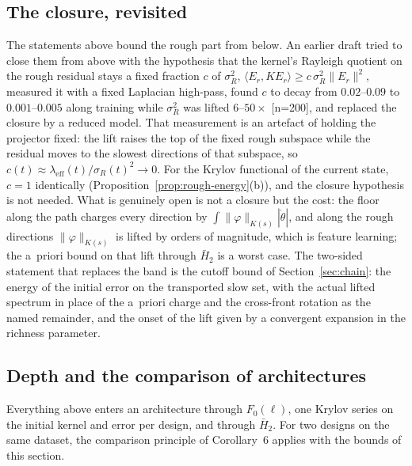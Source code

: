 \subsection{The closure, revisited}
\label{ssec:hr-closure}
The statements above bound the rough part from below. An earlier draft tried
to close them from above with the hypothesis that the kernel's Rayleigh
quotient on the rough residual stays a fixed fraction $c$ of $\sigma_R^2$,
$\langle E_r,KE_r\rangle\ge c\,\sigma_R^2\|E_r\|^2$, measured it with a fixed
Laplacian high-pass, found $c$ to decay from $0.02$--$0.09$ to $0.001$--$0.005$
along training while $\sigma_R^2$ was lifted $6$--$50\times$ [n=200], and
replaced the closure by a reduced model. That measurement is an artefact of
holding the projector fixed: the lift raises the top of the fixed rough
subspace while the residual moves to the slowest directions of that
subspace, so $c(t)\approx\lambda_{\mathrm{eff}}(t)/\sigma_R(t)^2\to0$. For the
Krylov functional of the current state, $c=1$ identically
(Proposition~\ref{prop:rough-energy}(b)), and the closure hypothesis is not
needed. What is genuinely open is not a closure but the cost: the floor along
the path charges every direction by $\int\|\varphi\|_{K(s)}|\dot\theta|$, and
along the rough directions $\|\varphi\|_{K(s)}$ is lifted by orders of
magnitude, which is feature learning; the a~priori bound on that lift through
$\bar H_2$ is a worst case. The two-sided statement that replaces the band is
the cutoff bound of Section~\ref{sec:chain}: the energy of the initial error
on the transported slow set, with the actual lifted spectrum in place of the
a~priori charge and the cross-front rotation as the named remainder, and the
onset of the lift given by a convergent expansion in the richness parameter.

\subsection{Depth and the comparison of architectures}

Everything above enters an architecture through $F_0(\ell)$, one Krylov series
on the initial kernel and error per design, and through $\bar H_2$. For two
designs on the same dataset, the comparison principle of Corollary~6 applies
with the bounds of this section.

